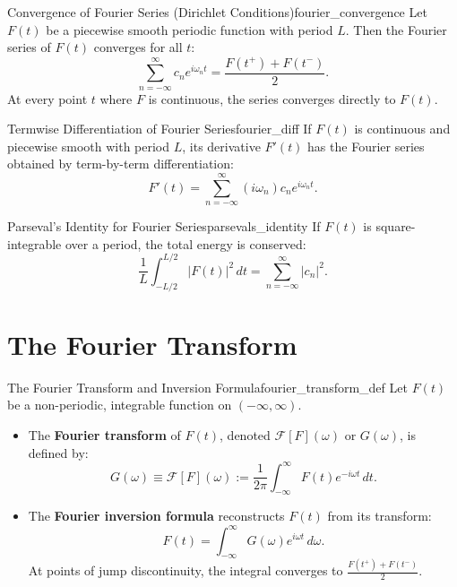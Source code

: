 \begin{theorem}{Convergence of Fourier Series (Dirichlet Conditions)}{fourier_convergence}
Let $F(t)$ be a piecewise smooth periodic function with period $L$. Then the Fourier series of $F(t)$ converges for all $t$:
\begin{equation}
\sum_{n=-\infty}^\infty c_n e^{i \omega_n t} = \frac{F(t^+) + F(t^-)}{2}.
\end{equation}
At every point $t$ where $F$ is continuous, the series converges directly to $F(t)$.
\end{theorem}

\begin{proposition}{Termwise Differentiation of Fourier Series}{fourier_diff}
If $F(t)$ is continuous and piecewise smooth with period $L$, its derivative $F'(t)$ has the Fourier series obtained by term-by-term differentiation:
\begin{equation}
F'(t) = \sum_{n=-\infty}^\infty (i \omega_n) c_n e^{i \omega_n t}.
\end{equation}
\end{proposition}

\begin{theorem}{Parseval's Identity for Fourier Series}{parsevals_identity}
If $F(t)$ is square-integrable over a period, the total energy is conserved:
\begin{equation}
\frac{1}{L} \int_{-L/2}^{L/2} |F(t)|^2\, dt = \sum_{n=-\infty}^\infty |c_n|^2.
\end{equation}
\end{theorem}


\section{The Fourier Transform}

\begin{definition}{The Fourier Transform and Inversion Formula}{fourier_transform_def}
Let $F(t)$ be a non-periodic, integrable function on $(-\infty, \infty)$.
\begin{itemize}
    \item The \textbf{Fourier transform} of $F(t)$, denoted $\mathcal{F}[F](\omega)$ or $G(\omega)$, is defined by:
    \begin{equation}
    G(\omega) \equiv \mathcal{F}[F](\omega) := \frac{1}{2\pi} \int_{-\infty}^\infty F(t) e^{-i\omega t}\, dt.
    \end{equation}
    \item The \textbf{Fourier inversion formula} reconstructs $F(t)$ from its transform:
    \begin{equation}
    F(t) = \int_{-\infty}^\infty G(\omega) e^{i\omega t}\, d\omega.
    \end{equation}
    At points of jump discontinuity, the integral converges to $\frac{F(t^+) + F(t^-)}{2}$.
\end{itemize}
\end{definition}

